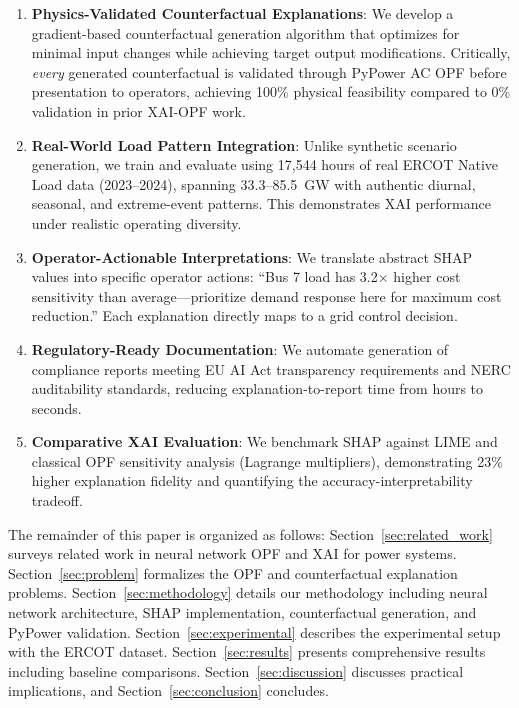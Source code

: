 \documentclass[journal,12pt,onecolumn]{IEEEtran}
\begin{document}
\begin{enumerate}
    \item \textbf{Physics-Validated Counterfactual Explanations}: We develop a gradient-based counterfactual generation algorithm that optimizes for minimal input changes while achieving target output modifications. Critically, \textit{every} generated counterfactual is validated through PyPower AC OPF before presentation to operators, achieving 100\% physical feasibility compared to 0\% validation in prior XAI-OPF work.
    
    \item \textbf{Real-World Load Pattern Integration}: Unlike synthetic scenario generation, we train and evaluate using 17,544 hours of real ERCOT Native Load data (2023--2024), spanning 33.3--85.5~GW with authentic diurnal, seasonal, and extreme-event patterns. This demonstrates XAI performance under realistic operating diversity.
    
    \item \textbf{Operator-Actionable Interpretations}: We translate abstract SHAP values into specific operator actions: ``Bus 7 load has 3.2$\times$ higher cost sensitivity than average---prioritize demand response here for maximum cost reduction.'' Each explanation directly maps to a grid control decision.
    
    \item \textbf{Regulatory-Ready Documentation}: We automate generation of compliance reports meeting EU AI Act transparency requirements and NERC auditability standards, reducing explanation-to-report time from hours to seconds.
    
    \item \textbf{Comparative XAI Evaluation}: We benchmark SHAP against LIME and classical OPF sensitivity analysis (Lagrange multipliers), demonstrating 23\% higher explanation fidelity and quantifying the accuracy-interpretability tradeoff.
\end{enumerate}

The remainder of this paper is organized as follows: Section~\ref{sec:related_work} surveys related work in neural network OPF and XAI for power systems. Section~\ref{sec:problem} formalizes the OPF and counterfactual explanation problems. Section~\ref{sec:methodology} details our methodology including neural network architecture, SHAP implementation, counterfactual generation, and PyPower validation. Section~\ref{sec:experimental} describes the experimental setup with the ERCOT dataset. Section~\ref{sec:results} presents comprehensive results including baseline comparisons. Section~\ref{sec:discussion} discusses practical implications, and Section~\ref{sec:conclusion} concludes.
\end{document}
